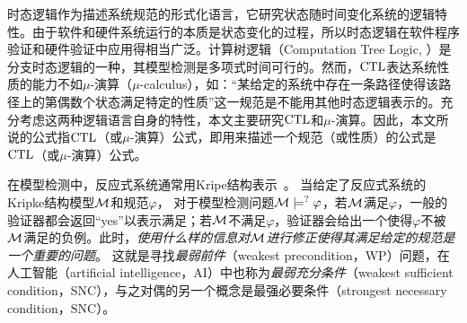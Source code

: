        
时态逻辑作为描述系统规范的形式化语言，它研究状态随时间变化系统的逻辑特性。由于软件和硬件系统运行的本质是状态变化的过程，所以时态逻辑在软件程序验证和硬件验证中应用得相当广泛。计算树逻辑（Computation Tree Logic, \CTL）是分支时态逻辑的一种，其模型检测是多项式时间可行的。然而，$\textrm{CTL}$表达系统性质的能力不如$\mu$-演算（$\mu$-calculus），如：“某给定的系统中存在一条路径使得该路径上的第偶数个状态满足特定的性质”这一规范是不能用其他时态逻辑表示的\cite{DBLP:series/txtcs/Schneider04}。充分考虑这两种逻辑语言自身的特性，本文主要研究$\textrm{CTL}$和$\mu$-演算。因此，本文所说的公式指$\textrm{CTL}$（或$\mu$-演算）公式，即用来描述一个规范（或性质）的公式是$\textrm{CTL}$（或$\mu$-演算）公式。

在模型检测中，反应式系统通常用Kripe结构表示~\cite{DBLP:journals/fcsc/ZhuWXX10,DBLP:series/txtcs/Schneider04}。
当给定了反应式系统的Kripke结构模型${\cal M}$和规范$\varphi$，
对于模型检测问题${\cal M}\models^? \varphi$，若${\cal M}$满足$\varphi$，一般的验证器都会返回“yes”以表示满足；若${\cal M}$不满足$\varphi$，验证器会给出一个使得$\varphi$不被${\cal M}$满足的负例。此时，\emph{使用什么样的信息对${\cal M}$进行修正使得其满足给定的规范是一个重要的问题}。
这就是寻找{\em 最弱前件}（weakest precondition，WP）问题\cite{DBLP:journals/cacm/Dijkstra75}，在人工智能（artificial intelligence，AI）中也称为{\em 最弱充分条件}（weakest sufficient condition，SNC），与之对偶的另一个概念是最强必要条件（strongest necessary condition，SNC）\cite{DBLP:journals/ai/Lin01,DBLP:journals/jair/Lin03}。

